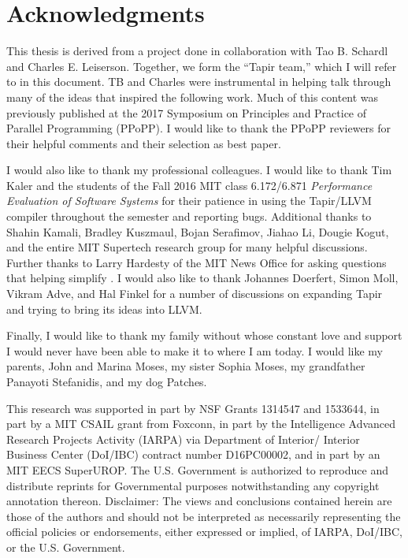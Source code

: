 \setcounter{savepage}{\thepage}
\begin{abstractpage}

\end{abstractpage}

% 

\cleardoublepage

\section*{Acknowledgments}
This thesis is derived from a project done in collaboration with Tao B. Schardl and Charles E. Leiserson.
Together, we form the ``Tapir team,'' which I will refer to in this document.
TB and Charles were instrumental in helping talk through many of the ideas that inspired the following work.
Much of this content was previously published at the 2017 Symposium on Principles and Practice of Parallel Programming (PPoPP)\cite{tapir}. I would like to thank the PPoPP reviewers for their helpful comments
and their selection as best paper.

I would also like to thank my professional colleagues.
I would like to thank Tim Kaler and the students of the Fall 2016 MIT class
6.172/6.871 \textit{Performance Evaluation of Software Systems} for
their patience in using the Tapir/LLVM compiler throughout the
semester and reporting bugs. Additional thanks
to Shahin Kamali, Bradley Kuszmaul, Bojan Serafimov, Jiahao Li, Dougie Kogut,
and the entire MIT Supertech research group for many helpful discussions.
Further thanks to Larry Hardesty of the MIT News Office for asking
questions that helping simplify . I would also like to
thank Johannes Doerfert, Simon Moll, Vikram Adve, and
Hal Finkel for a number of discussions on expanding Tapir and trying to bring
its ideas into LLVM. 

Finally, I would like to thank my family without whose constant love and
support I would never have been able to make it to where I am today.
I would like my parents, John and Marina Moses, my sister Sophia Moses,
my grandfather Panayoti Stefanidis, and my dog Patches.

This research was supported in part by NSF Grants 1314547
and 1533644, in part by a MIT CSAIL grant from Foxconn,
in part by the Intelligence Advanced Research Projects Activity
(IARPA) via Department of Interior/ Interior Business Center (DoI/IBC)
contract number D16PC00002, and in part by an MIT EECS SuperUROP\@.
The U.S. Government is authorized to
reproduce and distribute reprints for Governmental purposes
notwithstanding any copyright annotation thereon.  Disclaimer: The
views and conclusions contained herein are those of the authors and
should not be interpreted as necessarily representing the official
policies or endorsements, either expressed or implied, of IARPA,
DoI/IBC, or the U.S. Government.


